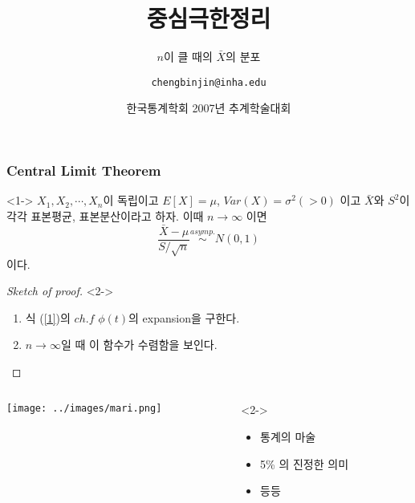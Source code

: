 \documentclass{beamer}
\title{중심극한정리}
\subtitle{$n$이 클 때의 $\bar{X}$의 분포}
\author[Cheng-Bin Jin]{\texttt{chengbinjin@inha.edu}}
\date[\today]{한국통계학회 2007년 추계학술대회}
\institute{인하대 정보통신학과}
\begin{document}

\begin{frame}
\titlepage
\end{frame}

\begin{frame}
\frametitle{Central Limit Theorem}
\begin{theorem}<1->
$X_1, X_2, \cdots, X_n$이 독립이고 $E[X] = \mu$,
$Var(X)=\sigma^2 (>0)$ 이고 $\bar{X}$와 $S^2$이 각각
표본평균, 표본분산이라고 하자.
이때 $n \rightarrow \infty$ 이면
\begin{equation} \label{1}
\frac{\bar{X} - \mu}{S/\sqrt{n}} \stackrel{asymp.}{\sim}N(0,1)
\end{equation}
이다.
\end{theorem}
\begin{proof}[Sketch of proof]<2->
\begin{enumerate}
\item<3-> 식 (\ref{1})의 $ch.f$ $\phi(t)$의 expansion을 구한다.
\item<4-> $n \rightarrow \infty$일 때 이 함수가 수렴함을 보인다.
\end{enumerate}
\end{proof}
\end{frame}

\begin{frame}
\begin{columns}[T]
\begin{column}{3in}
\centerline{
\texttt{[image: ../images/mari.png]}}
\end{column}
\begin{column}{8cm}<2->
\begin{itemize}
\item 통계의 마술
\item 5\% 의 진정한 의미
\item 등등
\end{itemize}
\end{column}
\end{columns}
\end{frame}
\end{document}

